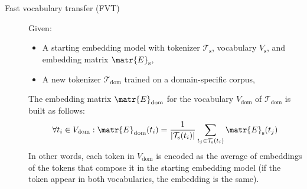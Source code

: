 \begin{description}
        \begin{description}
            \item[Fast vocabulary transfer (FVT)] 
                Given:
                \begin{itemize}
                    \item A starting embedding model with tokenizer $\mathcal{T}_\text{s}$, vocabulary $V_\text{s}$, and embedding matrix $\matr{E}_\text{s}$,
                    \item A new tokenizer $\mathcal{T}_\text{dom}$ trained on a domain-specific corpus,
                \end{itemize}
                The embedding matrix $\matr{E}_\text{dom}$ for the vocabulary $V_\text{dom}$ of $\mathcal{T}_\text{dom}$ is built as follows:
                \[ 
                    \forall t_i \in V_\text{dom}: \matr{E}_\text{dom}(t_i) = \frac{1}{|\mathcal{T}_\text{s}(t_i)|} \sum_{t_j \in \mathcal{T}_\text{s}(t_i)}\matr{E}_\text{s}(t_j)
                \]
                In other words, each token in $V_\text{dom}$ is encoded as the average of embeddings of the tokens that compose it in the starting embedding model (if the token appear in both vocabularies, the embedding is the same).
        \end{description}

\end{description}